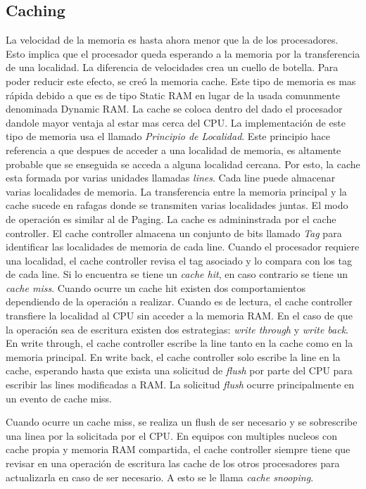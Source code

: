 \subsection{Caching}
La velocidad de la memoria es hasta ahora menor que la de los procesadores.
Esto implica que el procesador queda esperando a la memoria por la
transferencia de una localidad. La diferencia de velocidades crea un cuello de
botella. Para poder reducir este efecto, se creó la memoria cache. Este tipo de
memoria es mas rápida debido a que es de tipo Static RAM en lugar de la usada
comunmente denominada Dynamic RAM. La cache se coloca dentro del dado el
procesador dandole mayor ventaja al estar mas cerca del CPU. La implementación
de este tipo de memoria usa el llamado \emph{Principio de Localidad}. Este
principio hace referencia a que despues de acceder a una localidad de memoria,
es altamente probable que se enseguida se acceda a alguna localidad
cercana. Por esto, la cache esta formada por varias unidades llamadas
\emph{lines}. Cada line puede almacenar varias localidades de memoria. La
transferencia entre la memoria principal y la cache sucede en rafagas donde se
transmiten varias localidades juntas. El modo de operación es similar al de
Paging. La cache es admininstrada por el cache controller. El cache controller
almacena un conjunto de bits llamado \emph{Tag} para identificar las
localidades de memoria de cada line. Cuando el procesador requiere una
localidad, el cache controller revisa el tag asociado y lo compara con los tag
de cada line. Si lo encuentra se tiene un \emph{cache hit}, en caso contrario
se tiene un \emph{cache miss}. Cuando ocurre un cache hit existen dos
comportamientos dependiendo de la operación a realizar. Cuando es de lectura,
el cache controller transfiere la localidad al CPU sin acceder a la memoria
RAM. En el caso de que la operación sea de escritura existen dos estrategias:
\emph{write through} y \emph{write back}. En write through, el cache controller
escribe la line tanto en la cache como en la memoria principal. En write back,
el cache controller solo escribe la line en la cache, esperando hasta que
exista una solicitud de \emph{flush} por parte del CPU para escribir las lines
modificadas a RAM. La solicitud \emph{flush} ocurre principalmente en un evento
de cache miss.

Cuando ocurre un cache miss, se realiza un flush de ser necesario y se
sobrescribe una linea por la solicitada por el CPU. En equipos con multiples
nucleos con cache propia y memoria RAM compartida, el cache controller siempre
tiene que revisar en una operación de escritura las cache de los otros
procesadores para actualizarla en caso de ser necesario. A esto se le llama
\emph{cache snooping}.

